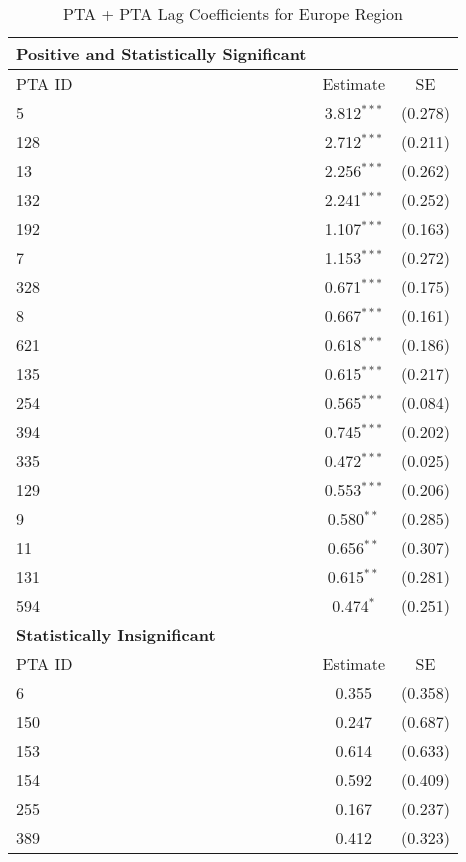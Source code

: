 \begin{table}[htbp]
    \centering
    \caption{PTA + PTA Lag Coefficients for Europe Region}
    \label{tab:pta_europe}
    \begin{adjustbox}{max width=\textwidth}
    \begin{tabular}{lcc}
    \hline
    \textbf{Positive and Statistically Significant} &  &  \\
    \hline
    PTA ID & Estimate & SE \\
    \hline
    5   & 3.812$^{\ast\ast\ast}$ & (0.278) \\
    128 & 2.712$^{\ast\ast\ast}$ & (0.211) \\
    13  & 2.256$^{\ast\ast\ast}$ & (0.262) \\
    132 & 2.241$^{\ast\ast\ast}$ & (0.252) \\
    192 & 1.107$^{\ast\ast\ast}$ & (0.163) \\
    7   & 1.153$^{\ast\ast\ast}$ & (0.272) \\
    328 & 0.671$^{\ast\ast\ast}$ & (0.175) \\
    8   & 0.667$^{\ast\ast\ast}$ & (0.161) \\
    621 & 0.618$^{\ast\ast\ast}$ & (0.186) \\
    135 & 0.615$^{\ast\ast\ast}$ & (0.217) \\
    254 & 0.565$^{\ast\ast\ast}$ & (0.084) \\
    394 & 0.745$^{\ast\ast\ast}$ & (0.202) \\
    335 & 0.472$^{\ast\ast\ast}$ & (0.025) \\
    129 & 0.553$^{\ast\ast\ast}$ & (0.206) \\
    9   & 0.580$^{\ast\ast}$ & (0.285) \\
    11  & 0.656$^{\ast\ast}$ & (0.307) \\
    131 & 0.615$^{\ast\ast}$ & (0.281) \\
    594 & 0.474$^{\ast}$ & (0.251) \\
    \hline
    \textbf{Statistically Insignificant} &  &  \\
    \hline
    PTA ID & Estimate & SE \\
    \hline
    6   & 0.355 & (0.358) \\
    150 & 0.247 & (0.687) \\
    153 & 0.614 & (0.633) \\
    154 & 0.592 & (0.409) \\
    255 & 0.167 & (0.237) \\
    389 & 0.412 & (0.323) \\

\end{tabular}
\end{adjustbox}
\end{table}
